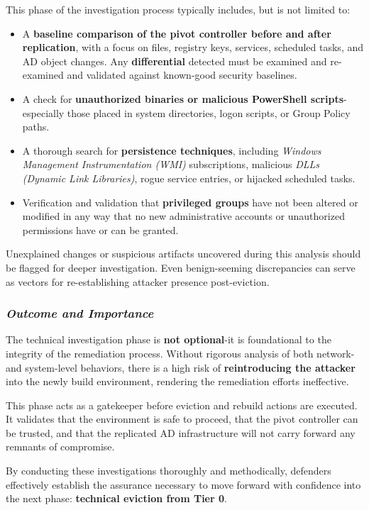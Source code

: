 This phase of the investigation process typically includes, but is not limited to:
\begin{itemize}
    \item A \textbf{baseline comparison of the pivot controller before and after replication}, with a focus on files, registry keys, services, scheduled tasks, and AD object changes. Any \textbf{differential} detected must be examined and re-examined and validated against known-good security baselines.
    \item A check for \textbf{unauthorized binaries or malicious PowerShell scripts}-especially those placed in system directories, logon scripts, or Group Policy paths.
    \item A thorough search for \textbf{persistence techniques}, including \textit{Windows Management Instrumentation (WMI)} subscriptions, malicious \textit{DLLs (Dynamic Link Libraries)}, rogue service entries, or hijacked scheduled tasks.
    \item Verification and validation that \textbf{privileged groups} have not been altered or modified in any way that no new administrative accounts or unauthorized permissions have or can be granted.
\end{itemize}

Unexplained changes or suspicious artifacts uncovered during this analysis should be flagged for deeper investigation. Even benign-seeming discrepancies can serve as vectors for re-establishing attacker presence post-eviction.

\subsubsection{\textbf{\textit{Outcome and Importance}}}
The technical investigation phase is \textbf{not optional}-it is foundational to the integrity of the remediation process. Without rigorous analysis of both network- and system-level behaviors, there is a high risk of \textbf{reintroducing the attacker} into the newly build environment, rendering the remediation efforts ineffective.

This phase acts as a gatekeeper before eviction and rebuild actions are executed. It validates that the environment is safe to proceed, that the pivot controller can be trusted, and that the replicated AD infrastructure will not carry forward any remnants of compromise.

By conducting these investigations thoroughly and methodically, defenders effectively establish the assurance necessary to move forward with confidence into the next phase: \textbf{technical eviction from Tier 0}.

